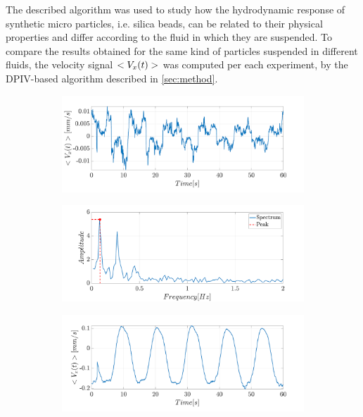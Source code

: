 \documentclass[journal]{IEEEtran}
\theoremstyle{definition}
\theoremstyle{remark}
\begin{document}
The described algorithm was used to study how the hydrodynamic response of synthetic micro particles, i.e. silica beads, can be related to their physical properties and differ according to the fluid in which they are suspended. To compare the results obtained for the same kind of particles suspended in different fluids, the velocity signal $<V_{x}(t)>$ was computed per each experiment, by the DPIV-based algorithm described in \sect\ref{sec:method}.

\begin{figure}[t]
\centering
    \begin{subfigure}[b]{\columnwidth}
    \centering
	\includegraphics[width=1\columnwidth]{images/BeadsA}
	\caption{}
	\label{A}
    \end{subfigure}
    \begin{subfigure}[b]{\columnwidth}
	\centering
	\includegraphics[width=1\columnwidth]{images/BeadsB}
	\caption{}
	\label{B}
    \end{subfigure}
    \begin{subfigure}[b]{\columnwidth}
	\centering
	\includegraphics[width=1\columnwidth]{images/BeadsC}

\end{subfigure}
\end{figure}
\end{document}
